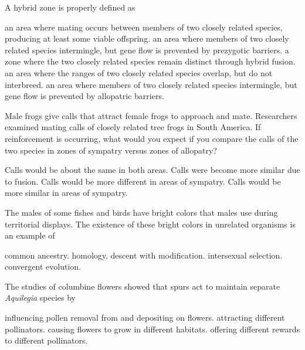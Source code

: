 \newpage

\question
A hybrid zone is properly defined as 

\begin{choices}
\correctchoice an area where mating occurs between members of two closely related species, producing at least some viable offspring. 
\choice an area where members of two closely related species intermingle, but gene flow is prevented by prezygotic barriers. 
\choice a zone where the two closely related species remain distinct through hybrid fusion. 
\choice an area where the ranges of two closely related species overlap, but do not interbreed. 
\choice an area where members of two closely related species intermingle, but gene flow is prevented by allopatric barriers. 
\end{choices}

\question
Male frogs give calls that attract female frogs to approach and mate. Researchers examined mating calls of closely related tree frogs in South America. If reinforcement is occurring, what would you expect if you compare the calls of the two species in zones of sympatry versus zones of allopatry? 

\begin{choices}
\choice Calls would be about the same in both areas. 
\choice Calls were become more similar due to fusion. 
\correctchoice Calls would be more different in areas of sympatry. 
\choice Calls would be more similar in areas of sympatry. 
\end{choices}

\question
The males of some fishes and birds have bright colors that males use during territorial displays. The existence of these bright colors in unrelated organisms is an example of 

\begin{choices}
\choice common ancestry. 
\choice homology. 
\choice descent with modification. 
\choice intersexual selection. 
\correctchoice convergent evolution. 
\end{choices}

\question
The studies of columbine flowers showed that spurs act to maintain separate \textit{Aquilegia} species by

\begin{choices}
\correctchoice influencing pollen removal from and depositing on flowers. 
\choice attracting different pollinators. 
\choice causing flowers to grow in different habitats. 
\choice offering different rewards to different pollinators. 
\end{choices}

